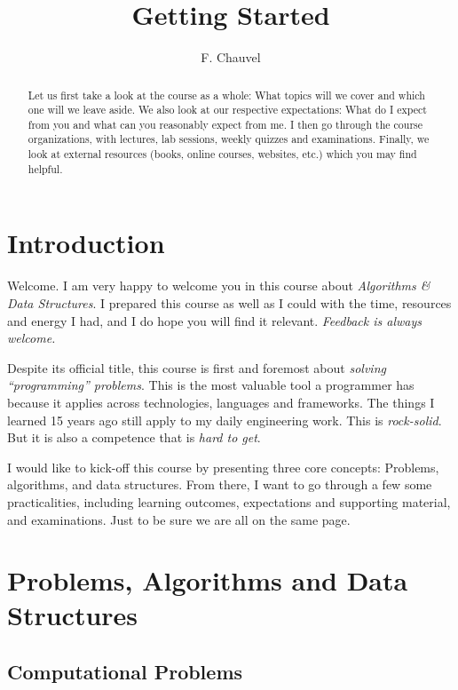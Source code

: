 \documentclass{aldast}
\title{Getting Started}
\author{F. Chauvel}
\begin{document}
\maketitle

\begin{abstract}
  Let us first take a look at the course as a whole: What topics will
  we cover and which one will we leave aside. We also look at our
  respective expectations: What do I expect from you and what can you
  reasonably expect from me. I then go through the course
  organizations, with lectures, lab sessions, weekly quizzes and
  examinations. Finally, we look at external resources (books, online
  courses, websites, etc.) which you may find helpful.
\end{abstract}


\section*{Introduction}
Welcome. I am very
happy to welcome you in this course about \emph{Algorithms \& Data
  Structures}. I prepared this course as well as I could with the
time, resources and energy I had, and I do hope you will find it
relevant. \emph{Feedback is always welcome.}

Despite its official title, this course is first and foremost about
\emph{solving ``programming'' problems}. This is the most valuable
tool a programmer has because it applies across technologies,
languages and frameworks. The things I learned 15 years ago still apply
to my daily engineering work. This is \emph{rock-solid}. But it is
also a competence that is \emph{hard to get}.

I would like to kick-off this course by presenting three core
concepts: Problems, algorithms, and data structures. From there, I
want to go through a few some practicalities, including learning
outcomes, expectations and supporting material, and examinations. Just
to be sure we are all on the same page.


\section{Problems, Algorithms and Data Structures}

\subsection{Computational Problems}
\end{document}
